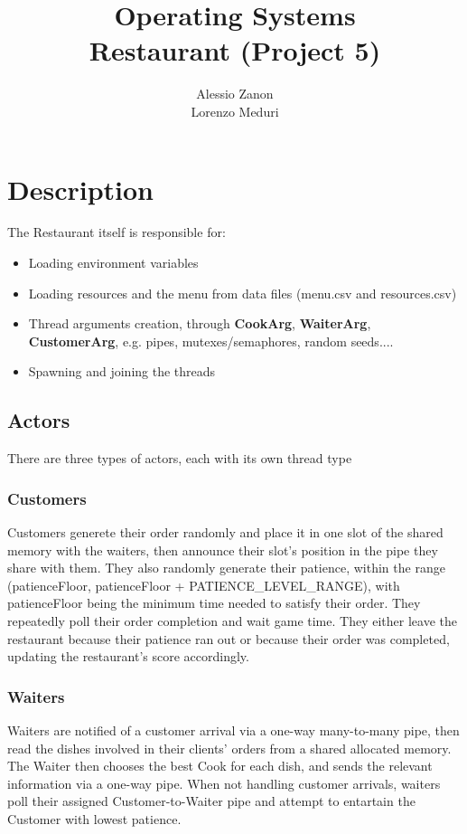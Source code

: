 \documentclass{article}
\title{\bf{Operating Systems  \\[0.3cm] \large Restaurant (Project 5)}}
\author{Alessio Zanon \\ Lorenzo Meduri}
\begin{document}
\maketitle
\newpage
\tableofcontents \label{Contents}


\newpage

\section{Description}
The Restaurant itself is responsible for:
\begin{itemize}
	\item Loading environment variables
	\item Loading resources and the menu from data files (menu.csv and resources.csv)
	\item Thread arguments creation, through \textbf{CookArg}, \textbf{WaiterArg}, \textbf{CustomerArg}, e.g. pipes, mutexes/semaphores, random seeds....
	\item Spawning and joining the threads
\end{itemize}

\subsection{Actors}
There are three types of actors, each with its own thread type

\subsubsection{Customers}
Customers generete their order randomly and place it in one slot of the shared memory with the waiters, then announce their slot's position in the pipe they share with them.
They also randomly generate their patience, within the range (patienceFloor, patienceFloor + PATIENCE\_LEVEL\_RANGE), with patienceFloor being the minimum time needed to satisfy their order.
They repeatedly poll their order completion and wait game time. They either leave the restaurant because their patience ran out or because their order was completed, updating the restaurant's score accordingly.

\subsubsection{Waiters}
Waiters are notified of a customer arrival via a one-way many-to-many pipe, then read the dishes involved in their clients' orders from a shared allocated memory.
The Waiter then chooses the best Cook for each dish, and sends the relevant information via a one-way pipe.
When not handling customer arrivals, waiters poll their assigned Customer-to-Waiter pipe and attempt to entartain the Customer with lowest patience.
\end{document}
